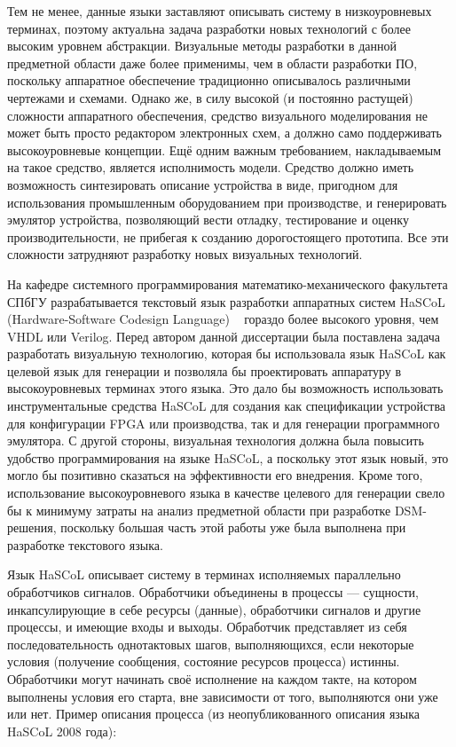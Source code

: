 Тем не менее, данные языки заставляют описывать систему в низкоуровневых терминах, 
поэтому актуальна задача разработки новых технологий с более высоким уровнем абстракции. 
Визуальные методы разработки в данной предметной области даже более применимы, чем 
в области разработки ПО, поскольку аппаратное обеспечение традиционно описывалось 
различными чертежами и схемами. Однако же, в силу высокой (и постоянно растущей) сложности 
аппаратного обеспечения, средство визуального моделирования не может быть просто редактором 
электронных схем, а должно само поддерживать высокоуровневые концепции. Ещё одним 
важным требованием, накладываемым на такое средство, является исполнимость модели. 
Средство должно иметь возможность синтезировать описание устройства в виде, пригодном 
для использования промышленным оборудованием при производстве, и генерировать эмулятор 
устройства, позволяющий вести отладку, тестирование и оценку производительности, не 
прибегая к созданию дорогостоящего прототипа. Все эти сложности затрудняют разработку 
новых визуальных технологий.

На кафедре системного программирования математико-механического факультета СПбГУ разрабатывается 
текстовый язык разработки аппаратных систем HaSCoL (Hardware-Software Codesign Language)%
~\cite{boulytchev2010hardware} гораздо более высокого уровня, чем VHDL или Verilog. Перед автором данной диссертации 
была поставлена задача разработать визуальную технологию, которая бы использовала 
язык HaSCoL как целевой язык для генерации и позволяла бы проектировать аппаратуру 
в высокоуровневых терминах этого языка. Это дало бы возможность использовать инструментальные 
средства HaSCoL для создания как спецификации устройства для конфигурации \ac{FPGA}
или производства, так и для генерации программного эмулятора. С другой стороны, визуальная 
технология должна была повысить удобство программирования на языке HaSCoL, а поскольку 
этот язык новый, это могло бы позитивно сказаться на эффективности его внедрения. 
Кроме того, использование высокоуровневого языка в качестве целевого для генерации 
свело бы к минимуму затраты на анализ предметной области при разработке \ac{DSM}-решения, 
поскольку большая часть этой работы уже была выполнена при разработке текстового языка.

Язык HaSCoL описывает систему  в терминах исполняемых параллельно обработчиков сигналов.
Обработчики объединены в процессы --- сущности, инкапсулирующие в себе ресурсы (данные), 
обработчики сигналов и другие процессы, и имеющие входы и выходы. Обработчик представляет 
из себя последовательность однотактовых шагов, выполняющихся, если некоторые условия 
(получение сообщения, состояние ресурсов процесса) истинны. Обработчики могут начинать 
своё исполнение на каждом такте, на котором выполнены условия его старта, вне зависимости 
от того, выполняются они уже или нет. Пример описания процесса (из неопубликованного
описания языка HaSCoL 2008 года):

